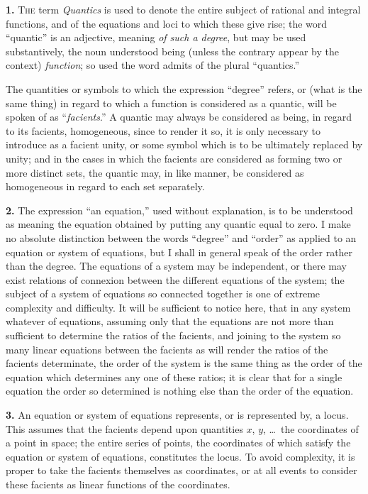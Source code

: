 \documentclass[12pt,a4paper]{article}
\begin{document}
\textbf{1.} \textsc{The} term \textit{Quantics} is used to denote the entire subject of rational and integral functions, and of the equations and loci to which these give rise; the word ``quantic'' is an adjective, meaning \textit{of such a degree}, but may be used substantively, the noun understood being (unless the contrary appear by the context) \textit{function}; so used the word admits of the plural ``quantics.''

The quantities or symbols to which the expression ``degree'' refers, or (what is the same thing) in regard to which a function is considered as a quantic, will be spoken of as ``\textit{facients}.'' A quantic may always be considered as being, in regard to its facients, homogeneous, since to render it so, it is only necessary to introduce as a facient unity, or some symbol which is to be ultimately replaced by unity; and in the cases in which the facients are considered as forming two or more distinct sets, the quantic may, in like manner, be considered as homogeneous in regard to each set separately.

\textbf{2.} The expression ``an equation,'' used without explanation, is to be understood as meaning the equation obtained by putting any quantic equal to zero. I make no absolute distinction between the words ``degree'' and ``order'' as applied to an equation or system of equations, but I shall in general speak of the order rather than the degree. The equations of a system may be independent, or there may exist relations of connexion between the different equations of the system; the subject of a system of equations so connected together is one of extreme complexity and difficulty. It will be sufficient to notice here, that in any system whatever of equations, assuming only that the equations are not more than sufficient to determine the ratios of the facients, and joining to the system so many linear equations between the facients as will render the ratios of the facients determinate, the order of the system is the same thing as the order of the equation which determines any one of these ratios; it is clear that for a single equation the order so determined is nothing else than the order of the equation.

\newpage
\setcounter{page}{222}

\textbf{3.} An equation or system of equations represents, or is represented by, a locus. This assumes that the facients depend upon quantities $x$, $y$, \ldots\ the coordinates of a point in space; the entire series of points, the coordinates of which satisfy the equation or system of equations, constitutes the locus. To avoid complexity, it is proper to take the facients themselves as coordinates, or at all events to consider these facients as linear functions of the coordinates.
\end{document}
